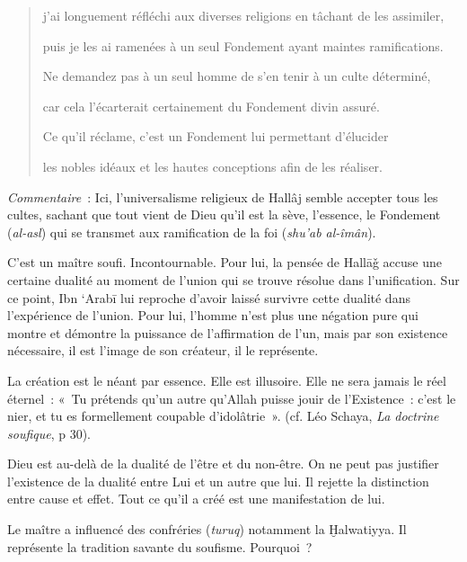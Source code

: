 \begin{quote}
j'ai longuement réfléchi aux diverses religions en tâchant de les
assimiler,

puis je les ai ramenées à un seul Fondement ayant maintes ramifications.

Ne demandez pas à un seul homme de s'en tenir à un culte déterminé,

car cela l'écarterait certainement du Fondement divin assuré.

Ce qu'il réclame, c'est un Fondement lui permettant d'élucider

les nobles idéaux et les hautes conceptions afin de les réaliser.
\end{quote}

\emph{Commentaire~}: Ici, l'universalisme religieux de Hallâj semble
accepter tous les cultes, sachant que tout vient de Dieu qu'il est la
sève, l'essence, le Fondement (\emph{al-asl}) qui se transmet aux
ramification de la foi (\emph{shu'ab al-îmân}).


C'est un maître soufi. Incontournable. Pour lui, la pensée de Hallāǧ
accuse une certaine dualité au moment de l'union qui se trouve résolue
dans l'unification. Sur ce point, Ibn `Arabī lui reproche d'avoir laissé
survivre cette dualité dans l'expérience de l'union. Pour lui, l'homme
n'est plus une négation pure qui montre et démontre la puissance de
l'affirmation de l'un, mais par son existence nécessaire, il est l'image
de son créateur, il le représente.

La création est le néant par essence. Elle est illusoire. Elle ne sera
jamais le réel éternel~: «~Tu prétends qu'un autre qu'Allah puisse jouir
de l'Existence~: c'est le nier, et tu es formellement coupable
d'idolâtrie~». (cf. Léo Schaya, \emph{La doctrine soufique}, p 30).

Dieu est au-delà de la dualité de l'être et du non-être. On ne peut pas
justifier l'existence de la dualité entre Lui et un autre que lui. Il
rejette la distinction entre cause et effet. Tout ce qu'il a créé est
une manifestation de lui.

Le maître a influencé des confréries (\emph{turuq}) notamment la
Ḫalwatiyya. Il représente la tradition savante du soufisme. Pourquoi~?

